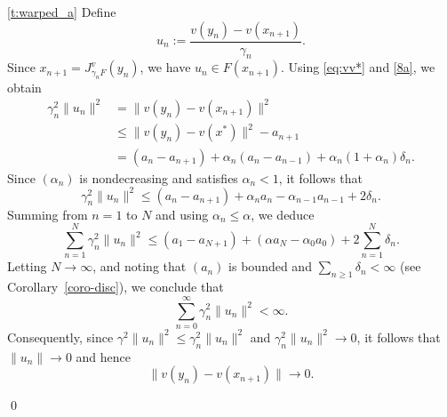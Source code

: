\documentclass[11pt]{article}
\makeatletter
\renewenvironment{proof}[1][\proofname]{\par
	\normalfont
	\topsep0\p@\@plus3\p@ \trivlist
	\item[\hskip\labelsep\itshape
	#1\@addpunct{.}]\ignorespaces
}{%
	\qed\endtrivlist
}
\theoremstyle{definition}
\theoremstyle{definition}
\theoremstyle{definition}
\newcommand{\tcb}{\textcolor{blue}}
\newcommand{\tcr}{\textcolor{red}}
\def\tcb{ \textcolor{blue}}
\def\tcr{ \textcolor{red}}
\makeatother
\begin{document}
\medskip 
\vskip 2mm
\begin{proof}
 

\medskip
\ref{t:warped_a} 
%
{
Define
\[
u_n := \frac{v(y_n)-v(x_{n+1})}{\gamma_n}.
\]
Since \(x_{n+1}=J_{\gamma_n F}^v(y_n)\), we have \(u_n\in F(x_{n+1})\).
Using \eqref{eq:vv*} and \eqref{8a}, we obtain
\begin{align*}
\gamma_n^2\|u_n\|^2
&= \|v(y_n)-v(x_{n+1})\|^2 \\
&\le \|v(y_n)-v(x^*)\|^2 - a_{n+1} \\
&= (a_n-a_{n+1}) + \alpha_n(a_n-a_{n-1})
   + \alpha_n(1+\alpha_n)\delta_n.
\end{align*}
Since \((\alpha_n)\) is nondecreasing and satisfies \(\alpha_n<1\), it follows that
\[
\gamma_n^2\|u_n\|^2
\le (a_n-a_{n+1}) + \alpha_n a_n - \alpha_{n-1} a_{n-1}
   + 2\delta_n.
\]
Summing from \(n=1\) to \(N\) and using \(\alpha_n\le \alpha\), we deduce
\[
\sum_{n=1}^{N}\gamma_n^2\|u_n\|^2
\le (a_1-a_{N+1}) + (\alpha a_N-\alpha_0 a_0)
   + 2\sum_{n=1}^{N}\delta_n.
\]
Letting \(N\to\infty\), and noting that \((a_n)\) is bounded and
\(\sum_{n\ge1}\delta_n<\infty\) (see Corollary~\ref{coro-disc}), we conclude that
\[
\sum_{n=0}^{\infty}\gamma_n^2\|u_n\|^2 < \infty.
\]
Consequently, since \(\gamma^2\|u_n\|^2 \le \gamma_n^2\|u_n\|^2\) and
\(\gamma_n^2\|u_n\|^2 \to 0\), it follows that \(\|u_n\|\to 0\) and hence
\[
\|v(y_n)-v(x_{n+1})\|\to 0.
\]
}
\medskip


\end{proof}
\end{document}
